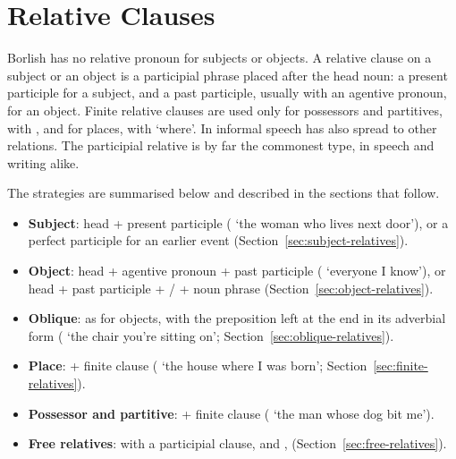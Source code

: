 \chapter{Relative Clauses}\label{ch:relative-clauses}

Borlish has no relative pronoun for subjects or objects. A relative clause on a subject or an object is a participial phrase placed after the head noun: a present participle for a subject, and a past participle, usually with an agentive pronoun, for an object. Finite relative clauses are used only for possessors and partitives, with , and for places, with  `where'. In informal speech  has also spread to other relations. The participial relative is by far the commonest type, in speech and writing alike.

The strategies are summarised below and described in the sections that follow.
\begin{itemize}
    \item \textbf{Subject}: head + present participle ( `the woman who lives next door'), or a perfect participle for an earlier event (Section~\ref{sec:subject-relatives}).
    \item \textbf{Object}: head + agentive pronoun + past participle ( `everyone I know'), or head + past participle + / + noun phrase (Section~\ref{sec:object-relatives}).
    \item \textbf{Oblique}: as for objects, with the preposition left at the end in its adverbial form ( `the chair you're sitting on'; Section~\ref{sec:oblique-relatives}).
    \item \textbf{Place}:  + finite clause ( `the house where I was born'; Section~\ref{sec:finite-relatives}).
    \item \textbf{Possessor and partitive}:  + finite clause ( `the man whose dog bit me').
    \item \textbf{Free relatives}:  with a participial clause, and ,  (Section~\ref{sec:free-relatives}).
\end{itemize}

